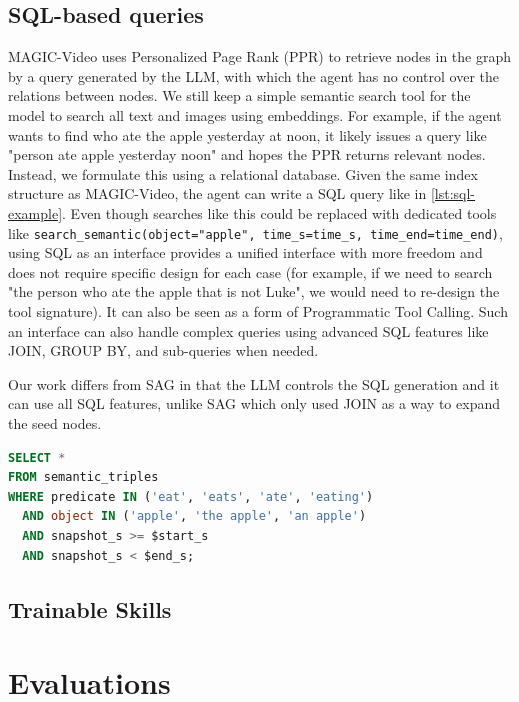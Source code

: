 \subsection{SQL-based queries}
MAGIC-Video uses Personalized Page Rank (PPR) to retrieve nodes in the graph by a query generated by the LLM, with which the agent has no control over the relations between nodes. We still keep a simple semantic search tool for the model to search all text and images using embeddings. For example, if the agent wants to find who ate the apple yesterday at noon, it likely issues a query like "person ate apple yesterday noon" and hopes the PPR returns relevant nodes. Instead, we formulate this using a relational database. Given the same index structure as MAGIC-Video, the agent can write a SQL query like in \cref{lst:sql-example}. Even though searches like this could be replaced with dedicated tools like \texttt{search\_semantic(object="apple", time\_s=time\_s, time\_end=time\_end)}, using SQL as an interface provides a unified interface with more freedom and does not require specific design for each case (for example, if we need to search "the person who ate the apple that is not Luke", we would need to re-design the tool signature). It can also be seen as a form of Programmatic Tool Calling. Such an interface can also handle complex queries using advanced SQL features like JOIN, GROUP BY, and sub-queries when needed. 

Our work differs from SAG \cite{wu_sag_2026} in that the LLM controls the SQL generation and it can use all SQL features, unlike SAG which only used JOIN as a way to expand the seed nodes. 

\begin{lstlisting}[language=SQL, caption={An example SQL query for finding who ate the apple within a given time window.}, label={lst:sql-example}]
SELECT *
FROM semantic_triples
WHERE predicate IN ('eat', 'eats', 'ate', 'eating')
  AND object IN ('apple', 'the apple', 'an apple')
  AND snapshot_s >= $start_s
  AND snapshot_s < $end_s;
\end{lstlisting}


\subsection{Trainable Skills}



\section{Evaluations}

